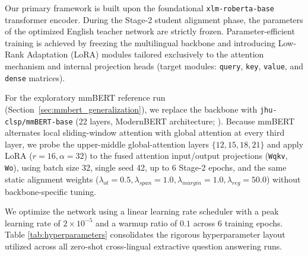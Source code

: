 \documentclass[11pt]{article}
\begin{document}
Our primary framework is built upon the foundational \texttt{xlm-roberta-base} transformer encoder. During the Stage-2 student alignment phase, the parameters of the optimized English teacher network are strictly frozen. Parameter-efficient training is achieved by freezing the multilingual backbone and introducing Low-Rank Adaptation (LoRA) modules tailored exclusively to the attention mechanism and internal projection heads (target modules: \texttt{query}, \texttt{key}, \texttt{value}, and \texttt{dense} matrices).

For the exploratory mmBERT reference run (Section~\ref{sec:mmbert_generalization}), we replace the backbone with \texttt{jhu-clsp/mmBERT-base} \citep{marone2026mmbert} (22 layers, ModernBERT architecture; \citealp{warner-etal-2025-smarter}). Because mmBERT alternates local sliding-window attention with global attention at every third layer, we probe the upper-middle global-attention layers $\{12, 15, 18, 21\}$ and apply LoRA ($r=16, \alpha=32$) to the fused attention input/output projections (\texttt{Wqkv}, \texttt{Wo}), using batch size 32, single seed 42, up to 6 Stage-2 epochs, and the same static alignment weights ($\lambda_{ot}=0.5, \lambda_{span}=1.0, \lambda_{margin}=1.0, \lambda_{reg}=50.0$) without backbone-specific tuning.

We optimize the network using a linear learning rate scheduler with a peak learning rate of $2\times 10^{-5}$ and a warmup ratio of $0.1$ across 6 training epochs. Table \ref{tab:hyperparameters} consolidates the rigorous hyperparameter layout utilized across all zero-shot cross-lingual extractive question answering runs.
\end{document}
